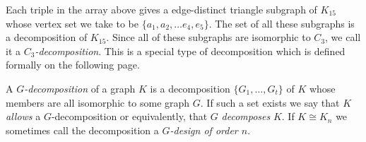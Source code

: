 \normalfont Each triple in the array above gives a edge-distinct triangle subgraph of $K_{15}$ whose vertex set we take to be $\{a_{1},a_{2},\hdots e_{4},e_{5}\}.$ The set of all these subgraphs is a decomposition of $K_{15}$. Since all of these subgraphs are isomorphic to $C_{3}$, we call it a \textit{$C_{3}$-decomposition}. This is a special type of decomposition which is defined formally on the following page.\newpage

\begin{definition}[$G$-decomposition]
A \textit{$G$-decomposition} of a graph $K$ is a decomposition $\{G_{1},\hdots,G_{t}\}$ of $K$ whose members are all isomorphic to some graph $G$. If such a set exists we say that $K$ \textit{allows} a $G$-decomposition or equivalently, that $G$ \textit{decomposes} $K$. If $K\cong K_{n}$ we sometimes call the decomposition a \textit{$G$-design of order $n$}.
\end{definition}

